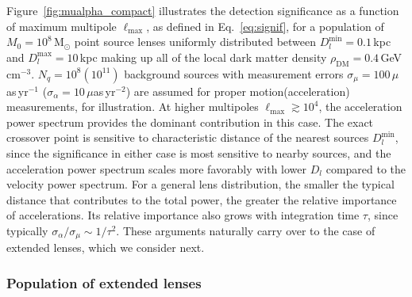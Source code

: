 \documentclass[twocolumn]{aastex63}
\begin{document}
Figure~\ref{fig:mualpha_compact} illustrates the detection significance as a function of maximum multipole $\ell_\mathrm{max}$, as defined in Eq.~\ref{eq:signif}, for a population of $M_0=10^8$\,M$_\odot$ point source lenses uniformly distributed between $D_l^{\mathrm{min}}=0.1$\,kpc and $D_l^{\mathrm{max}}=10$\,kpc making up all of the local dark matter density $\rho_\mathrm{DM}=0.4$\,GeV\,cm$^{-3}$. $N_q=10^8 (10^{11})$ background sources with measurement errors $\sigma_\mu=100\,\mu$as\,yr$^{-1}$ ($\sigma_\alpha=10\,\mu$as\,yr$^{-2}$) are assumed for proper motion(acceleration) measurements, for illustration. At higher multipoles $\ell_\mathrm{max}\gtrsim10^4$, the acceleration power spectrum provides the dominant contribution in this case. The exact crossover point is sensitive to characteristic distance of the nearest sources $D_{l}^{\mathrm{min}}$, since the significance in either case is most sensitive to nearby sources, and the acceleration power spectrum scales more favorably with lower $D_{l}$ compared to the velocity power spectrum. For a general lens distribution, the smaller the typical distance that contributes to the total power, the greater the relative importance of accelerations. Its relative importance also grows with integration time $\tau$, since typically $\sigma_\alpha/\sigma_\mu\sim1/\tau^2$. These arguments naturally carry over to the case of extended lenses, which we consider next.

\subsubsection{Population of extended lenses}
\label{sec:extended_pop}
\end{document}
